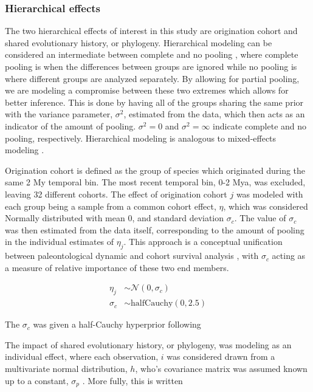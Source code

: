\documentclass[12pt,letterpaper]{article}
\begin{document}
\subsubsection{Hierarchical effects}

The two hierarchical effects of interest in this study are origination cohort and shared evolutionary history, or phylogeny. Hierarchical modeling can be considered an intermediate between complete and no pooling \citep{Gelman2007}, where complete pooling is when the differences between groups are ignored while no pooling is where different groups are analyzed separately. By allowing for partial pooling, we are modeling a compromise between these two extremes which allows for better inference. This is done by having all of the groups sharing the same prior with the variance parameter, \(\sigma^{2}\), estimated from the data, which then acts as an indicator of the amount of pooling. \(\sigma^{2} = 0\) and \(\sigma^{2} = \infty\) indicate complete and no pooling, respectively. Hierarchical modeling is analogous to mixed-effects modeling \citep{Gelman2007}. 

Origination cohort is defined as the group of species which originated during the same 2 My temporal bin. The most recent temporal bin, 0-2 Mya, was excluded, leaving 32 different cohorts. The effect of origination cohort \(j\) was modeled with each group being a sample from a common cohort effect, \(\eta\), which was considered Normally distributed with mean 0, and standard deviation \(\sigma_{c}\). The value of \(\sigma_{c}\) was then estimated from the data itself, corresponding to the amount of pooling in the individual estimates of \(\eta_{j}\). This approach is a conceptual unification between paleontological dynamic and cohort survival analysis \citep{Foote1988,Raup1978,Raup1975,VanValen1979,Baumiller1993}, with \(\sigma_{c}\) acting as a measure of relative importance of these two end members.

\begin{align*}
  \eta_{j} &\sim \mathcal{N}(0, \sigma_{c}) \\
  \sigma_{c} &\sim \mathrm{halfCauchy}(0, 2.5)
\end{align*}

The \(\sigma_{c}\) was given a half-Cauchy hyperprior following \citet{Gelman2006a}

The impact of shared evolutionary history, or phylogeny, was modeling as an individual effect, where each observation, \(i\) was considered drawn from a multivariate normal distribution, \(h\), who's covariance matrix was assumed known up to a constant, \(\sigma_{p}\) \citep{Lynch1991,Housworth2004}. More fully, this is written
\end{document}
